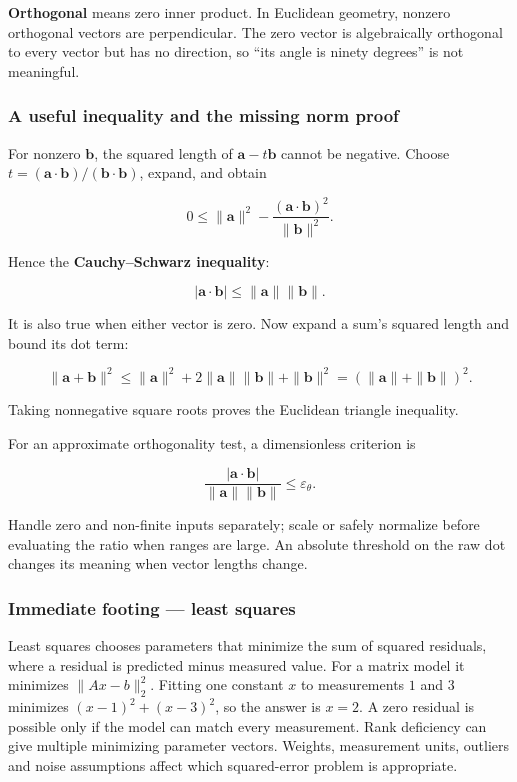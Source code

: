 \textbf{Orthogonal} means zero inner product. In Euclidean geometry, nonzero orthogonal vectors are perpendicular. The zero vector is algebraically orthogonal to every vector but has no direction, so ``its angle is ninety degrees'' is not meaningful.

\subsubsection{A useful inequality and the missing norm proof}\label{01-foundations-i-ch017-a-useful-inequality-and-the-missing-norm-proof}

For nonzero \(\mathbf b\), the squared length of \(\mathbf a-t\mathbf b\) cannot be negative. Choose \(t=(\mathbf a\cdot\mathbf b)/(\mathbf b\cdot\mathbf b)\), expand, and obtain

\[
0\le\|\mathbf a\|^2-
\frac{(\mathbf a\cdot\mathbf b)^2}{\|\mathbf b\|^2}.
\]

Hence the \textbf{Cauchy--Schwarz inequality}:

\[
|\mathbf a\cdot\mathbf b|\le\|\mathbf a\|\|\mathbf b\|.
\]

It is also true when either vector is zero. Now expand a sum's squared length and bound its dot term:

\[
\|\mathbf a+\mathbf b\|^2
\le\|\mathbf a\|^2+2\|\mathbf a\|\|\mathbf b\|+\|\mathbf b\|^2
=(\|\mathbf a\|+\|\mathbf b\|)^2.
\]

Taking nonnegative square roots proves the Euclidean triangle inequality.

For an approximate orthogonality test, a dimensionless criterion is

\[
\frac{|\mathbf a\cdot\mathbf b|}{\|\mathbf a\|\|\mathbf b\|}
\le\varepsilon_\theta.
\]

Handle zero and non-finite inputs separately; scale or safely normalize before evaluating the ratio when ranges are large. An absolute threshold on the raw dot changes its meaning when vector lengths change.

\subsubsection{Immediate footing --- least squares}\label{01-foundations-i-ch017-immediate-footing-least-squares}

Least squares chooses parameters that minimize the sum of squared residuals, where a residual is predicted minus measured value. For a matrix model it minimizes \(\lVert Ax-b\rVert_2^2\). Fitting one constant \(x\) to measurements \(1\) and \(3\) minimizes \((x-1)^2+(x-3)^2\), so the answer is \(x=2\). A zero residual is possible only if the model can match every measurement. Rank deficiency can give multiple minimizing parameter vectors. Weights, measurement units, outliers and noise assumptions affect which squared-error problem is appropriate.

